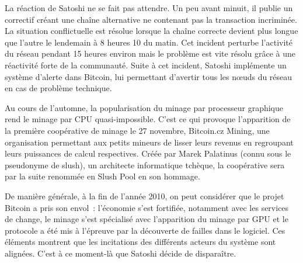 \clearpage
La réaction de Satoshi ne se fait pas attendre. Un peu avant minuit, il publie un correctif créant une chaîne alternative ne contenant pas la transaction incriminée. La situation conflictuelle est résolue lorsque la chaîne correcte devient plus longue que l'autre le lendemain à 8 heures 10 du matin. Cet incident perturbe l'activité du réseau pendant 15 heures environ mais le problème est vite résolu grâce à une réactivité forte de la communauté. Suite à cet incident, Satoshi implémente un système d'alerte dans Bitcoin, lui permettant d'avertir tous les nœuds du réseau en cas de problème technique.

Au cours de l'automne, la popularisation du minage par processeur graphique rend le minage par CPU quasi-impossible. C'est ce qui provoque l'apparition de la première coopérative de minage le 27 novembre, Bitcoin.cz Mining, une organisation permettant aux petits mineurs de lisser leurs revenus en regroupant leurs puissances de calcul respectives. Créée par Marek Palatinus (connu sous le pseudonyme de slush), un architecte informatique tchèque, la coopérative sera par la suite renommée en Slush Pool en son hommage.

De manière générale, à la fin de l'année 2010, on peut considérer que le projet Bitcoin a pris son envol~: l'économie s'est fortifiée, notamment avec les services de change, le minage s'est spécialisé avec l'apparition du minage par GPU et le protocole a été mis à l'épreuve par la découverte de failles dans le logiciel. Ces éléments montrent que les incitations des différents acteurs du système sont alignées. C'est à ce moment-là que Satoshi décide de disparaître.


